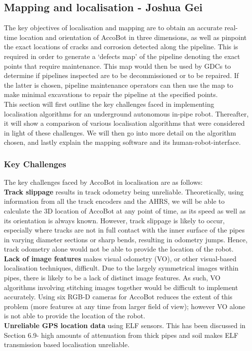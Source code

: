 \documentclass[11pt]{article}		%
\begin{document}
		\subsection[Mapping and localisation]{Mapping and localisation - Joshua Gei}
		The key objectives of localisation and mapping are to obtain an accurate real-time location and orientation of AccoBot in three dimensions, as well as pinpoint the exact locations of cracks and corrosion detected along the pipeline. This is required in order to generate a ‘defects map’ of the pipeline denoting the exact points that require maintenance. This map would then be used by GDCs to determine if pipelines inspected are to be decommissioned or to be repaired. If the latter is chosen, pipeline maintenance operators can then use the map to make minimal excavations to repair the pipeline at the specified points. 
        \\ \hspace*{3ex}This section will first outline the key challenges faced in implementing localisation algorithms for an underground autonomous in-pipe robot. Thereafter, it will show a comparison of various localisation algorithms that were considered in light of these challenges. We will then go into more detail on the algorithm chosen, and lastly explain the mapping software and its human-robot-interface.

		\subsubsection{Key Challenges}
		The key challenges faced by AccoBot in localisation are as follows: 
        \\ \hspace*{3ex}\textbf{Track slippage} results in track odometry being unreliable. Theoretically, using information from all the track encoders and the AHRS, we will be able to calculate the 3D location of AccoBot at any point of time, as its speed as well as its orientation is always known. However, track slippage is likely to occur, especially where tracks are not in full contact with the inner surface of the pipes in varying diameter sections or sharp bends, resulting in odometry jumps. Hence, track odometry alone would not be able to provide the location of the robot. 
        \\ \hspace*{3ex}\textbf{Lack of image features} makes visual odometry (VO), or other visual-based localisation techniques, difficult. Due to the largely symmetrical images within pipes, there is likely to be a lack of distinct image features. As such, VO algorithms involving stitching images together would be difficult to implement accurately. Using six RGB-D cameras for AccoBot reduces the extent of this problem (more features at any time from larger field of view); however VO alone is not able to provide the location of the robot. 
        \\ \hspace*{3ex}\textbf{Unreliable GPS location data} using ELF sensors. This has been discussed in Section 6.9- high amounts of attenuation from thick pipes and soil makes ELF transmission based localisation unreliable. 
\end{document}
